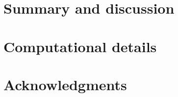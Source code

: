 \documentclass[article]{jss}
\begin{document}









\section{Summary and discussion} \label{sec:summary}



\section*{Computational details}




\section*{Acknowledgments}

\end{document}
